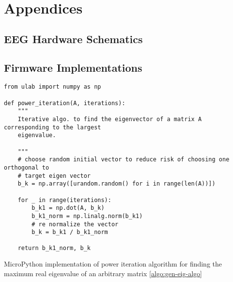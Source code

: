 \chapter{Appendices}
\label{chapter:appendices}

\graphicspath{ {report/Appendices/assets/} } 


\section{EEG Hardware Schematics}

\label{appendix:schematics}


\section{Firmware Implementations}
\label{app:firmware}

\begin{listing}[h]
\small
\begin{verbatim}
from ulab import numpy as np

def power_iteration(A, iterations):
    """
    Iterative algo. to find the eigenvector of a matrix A corresponding to the largest
    eigenvalue.
    
    """
    # choose random initial vector to reduce risk of choosing one orthogonal to 
    # target eigen vector
    b_k = np.array([urandom.random() for i in range(len(A))])

    for _ in range(iterations):
        b_k1 = np.dot(A, b_k)
        b_k1_norm = np.linalg.norm(b_k1)
        # re normalize the vector
        b_k = b_k1 / b_k1_norm

    return b_k1_norm, b_k

\end{verbatim}
\caption{MicroPython implementation of power iteration algorithm for finding the maximum real eigenvalue of an arbitrary matrix \ref{algo:gen-eig-algo}}
\label{app-listing:power-iteration-mpy}
\end{listing}


